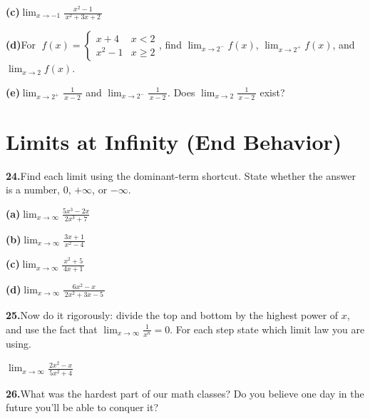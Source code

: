 \documentclass[12pt]{article}
\begin{document}
\textbf{(c)}\quad[4]\quad $\displaystyle\lim_{x \to -1} \frac{x^2 - 1}{\,x^2 + 3x + 2\,}$

\newpage
\textbf{(d)}\quad[4]\quad For $\;f(x) = \begin{cases} x + 4 & x < 2 \\ x^2 - 1 & x \ge 2 \end{cases}$,\;
find $\displaystyle\lim_{x \to 2^-} f(x)$, $\displaystyle\lim_{x \to 2^+} f(x)$, and $\displaystyle\lim_{x \to 2}
f(x)$.
\vspace{18em}

\textbf{(e)}\quad[4]\quad $\displaystyle\lim_{x \to 2^+} \frac{1}{\,x - 2\,}$ \;and\;
$\displaystyle\lim_{x \to 2^-} \frac{1}{\,x - 2\,}$.\; Does $\displaystyle\lim_{x \to 2} \frac{1}{\,x - 2\,}$ exist?

\newpage
\section*{Limits at Infinity (End Behavior)}

\textbf{24.}\quad[12 pts]\quad Find each limit using the dominant-term shortcut. State whether the answer is
a number, $0$, $+\infty$, or $-\infty$.

\medskip
\textbf{(a)}\quad $\displaystyle\lim_{x \to \infty} \frac{5x^3 - 2x}{\,2x^3 + 7\,}$
\vspace{6em}

\textbf{(b)}\quad $\displaystyle\lim_{x \to \infty} \frac{3x + 1}{\,x^2 - 4\,}$
\vspace{6em}

\textbf{(c)}\quad $\displaystyle\lim_{x \to \infty} \frac{x^2 + 5}{\,4x + 1\,}$
\vspace{6em}

\textbf{(d)}\quad $\displaystyle\lim_{x \to \infty} \frac{6x^2 - x}{\,2x^2 + 3x - 5\,}$
\vspace{6em}

\newpage
\textbf{25.}\quad[14 pts]\quad Now do it rigorously: divide the top and bottom by the highest power of
$x$, and use the fact that $\displaystyle\lim_{x\to\infty}\tfrac{1}{x^n} = 0$. For each step state which limit law you are using.

\medskip
$\displaystyle\lim_{x \to \infty} \frac{2x^2 - x}{\,5x^2 + 4\,}$

\newpage
\textbf{26.}\quad What was the hardest part of our math classes? Do you believe one day in the future you'll be able to conquer it?
\end{document}
